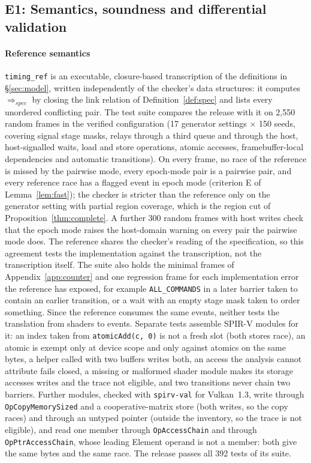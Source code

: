 \documentclass[acmtog,anonymous,review]{acmart}
\newcommand{\code}[1]{\texttt{#1}}
\newcommand{\spec}{\ensuremath{\Rightarrow_{\mathit{spec}}}}
\begin{document}
\subsection{E1: Semantics, soundness and differential validation}
\label{sec:eval-sem}

\paragraph{Reference semantics}
\code{timing\_ref} is an executable, closure-based transcription of the definitions in \S\ref{sec:model}, written
independently of the checker's data structures: it computes $\spec$ by closing the link relation of
Definition~\ref{def:spec} and lists every unordered conflicting pair. The test suite compares the release with it on
2,550 random frames in the verified configuration (17 generator settings $\times$ 150 seeds, covering signal stage
masks, relays through a third queue and through the host, host-signalled waits, load and store operations, atomic
accesses, framebuffer-local dependencies and automatic transitions). On every frame, no race of the reference is
missed by the pairwise mode, every epoch-mode pair is a pairwise pair, and every reference race has a flagged event in
epoch mode (criterion E of Lemma~\ref{lem:fast}); the checker is stricter than the reference only on the generator
setting with partial region coverage, which is the region cut of Proposition~\ref{thm:complete}. A further 300 random
frames with host writes check that the epoch mode raises the host-domain warning on every pair the pairwise mode
does. The reference shares the checker's reading of the specification, so this agreement tests the implementation
against the transcription, not the transcription itself. The suite also holds the minimal frames of
Appendix~\ref{app:counter} and one regression frame for each implementation error the reference has exposed, for
example \code{ALL\_COMMANDS} in a later barrier taken to contain an earlier transition, or a wait with an empty stage
mask taken to order something. Since the reference consumes the same events, neither tests the translation from
shaders to events. Separate tests assemble SPIR-V modules for it: an index taken from \code{atomicAdd(c, 0)} is not
a fresh slot (both stores race), an atomic is exempt only at device scope and only against atomics on the same
bytes, a helper called with two buffers writes both, an access the analysis cannot attribute fails closed, a missing
or malformed shader module makes its storage accesses writes and the trace not eligible, and two transitions never
chain two barriers. Further modules, checked with \code{spirv-val} for Vulkan~1.3, write through
\code{OpCopyMemorySized} and a cooperative-matrix store (both writes, so the copy races) and through an untyped
pointer (outside the inventory, so the trace is not eligible), and read one member through \code{OpAccessChain}
and through \code{OpPtrAccessChain}, whose leading Element operand is not a member: both give the same bytes and
the same race. The release passes all 392 tests of its suite.
\end{document}
